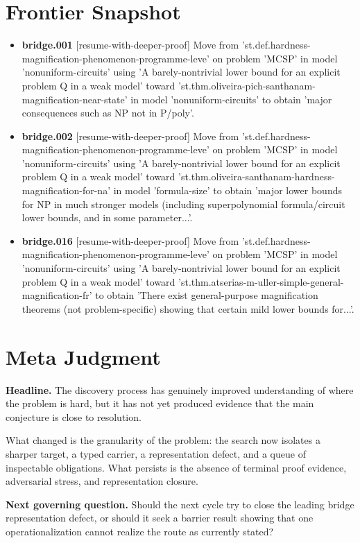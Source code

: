 \documentclass[11pt]{article}
\begin{document}
\section{Frontier Snapshot}
\begin{itemize}[leftmargin=1.5em]
\item \textbf{bridge.001} [resume-with-deeper-proof] Move from 'st.def.hardness-magnification-phenomenon-programme-leve' on problem 'MCSP' in model 'nonuniform-circuits' using 'A barely-nontrivial lower bound for an explicit problem Q in a weak model' toward 'st.thm.oliveira-pich-santhanam-magnification-near-state' in model 'nonuniform-circuits' to obtain 'major consequences such as NP not in P/poly'.
\item \textbf{bridge.002} [resume-with-deeper-proof] Move from 'st.def.hardness-magnification-phenomenon-programme-leve' on problem 'MCSP' in model 'nonuniform-circuits' using 'A barely-nontrivial lower bound for an explicit problem Q in a weak model' toward 'st.thm.oliveira-santhanam-hardness-magnification-for-na' in model 'formula-size' to obtain 'major lower bounds for NP in much stronger models (including superpolynomial formula/circuit lower bounds, and in some parameter...'.
\item \textbf{bridge.016} [resume-with-deeper-proof] Move from 'st.def.hardness-magnification-phenomenon-programme-leve' on problem 'MCSP' in model 'nonuniform-circuits' using 'A barely-nontrivial lower bound for an explicit problem Q in a weak model' toward 'st.thm.atserias-m-uller-simple-general-magnification-fr' to obtain 'There exist general-purpose magnification theorems (not problem-specific) showing that certain mild lower bounds for...'.
\end{itemize}

\section{Meta Judgment}
\textbf{Headline.} The discovery process has genuinely improved understanding of where the problem is hard, but it has not yet produced evidence that the main conjecture is close to resolution.

What changed is the granularity of the problem: the search now isolates a sharper target, a typed carrier, a representation defect, and a queue of inspectable obligations. What persists is the absence of terminal proof evidence, adversarial stress, and representation closure.

\textbf{Next governing question.} Should the next cycle try to close the leading bridge representation defect, or should it seek a barrier result showing that one operationalization cannot realize the route as currently stated?
\end{document}
